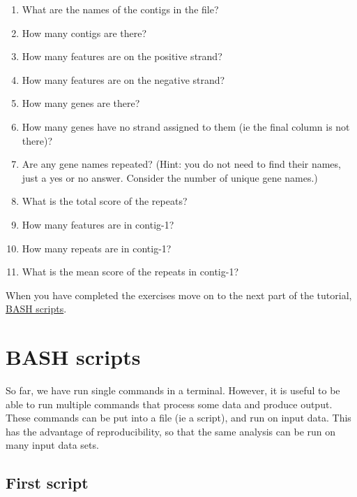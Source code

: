 \documentclass[11pt]{article}
\providecommand{\tightlist}{%
      \setlength{\itemsep}{0pt}\setlength{\parskip}{0pt}}
\begin{document}
\begin{enumerate}
\def\labelenumi{\arabic{enumi}.}
\tightlist
\item
  What are the names of the contigs in the file?
\item
  How many contigs are there?
\item
  How many features are on the positive strand?
\item
  How many features are on the negative strand?
\item
  How many genes are there?
\item
  How many genes have no strand assigned to them (ie the final column is
  not there)?
\item
  Are any gene names repeated? (Hint: you do not need to find their
  names, just a yes or no answer. Consider the number of unique gene
  names.)
\item
  What is the total score of the repeats?
\item
  How many features are in contig-1?
\item
  How many repeats are in contig-1?
\item
  What is the mean score of the repeats in contig-1?
\end{enumerate}

    When you have completed the exercises move on to the next part of the
tutorial, \href{bash_scripts.ipynb}{BASH scripts}.





\newpage





    \hypertarget{bash-scripts}{%
\section{BASH scripts}\label{bash-scripts}}

So far, we have run single commands in a terminal. However, it is useful
to be able to run multiple commands that process some data and produce
output. These commands can be put into a file (ie a script), and run on
input data. This has the advantage of reproducibility, so that the same
analysis can be run on many input data sets.

\hypertarget{first-script}{%
\subsection{First script}\label{first-script}}
\end{document}
